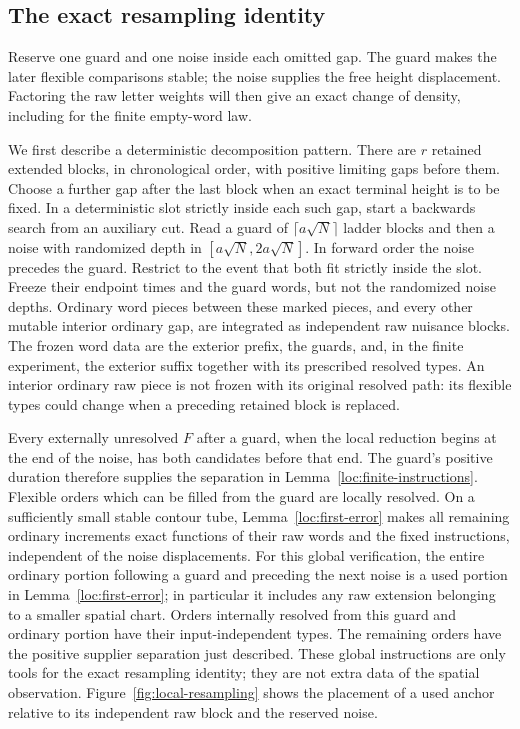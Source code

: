 \subsection{The exact resampling identity}

Reserve one guard and one noise inside each omitted gap. The guard makes
the later flexible comparisons stable; the noise supplies the free height
displacement. Factoring the raw letter weights will then give an exact
change of density, including for the finite empty-word law.

We first describe a deterministic decomposition pattern.  There are
$r$ retained extended blocks, in chronological order, with positive
limiting gaps before them.  Choose a further gap after the last block
when an exact terminal height is to be fixed.  In a deterministic slot
strictly inside each such gap, start a backwards search from an auxiliary
cut.  Read a guard of $\lceil a\sqrt N\rceil$ ladder blocks and then
a noise with randomized depth in $[a\sqrt N,2a\sqrt N]$.  In forward
order the noise precedes the guard.  Restrict to the event that both fit
strictly inside the slot.  Freeze their endpoint times and the guard
words, but not the randomized noise depths.  Ordinary word pieces between
these marked pieces, and every other mutable interior ordinary gap, are
integrated as independent raw nuisance blocks.  The frozen word data
are the exterior prefix, the guards, and, in the finite experiment, the
exterior suffix together with its prescribed resolved types.  An
interior ordinary raw piece is not frozen with its original resolved
path: its flexible types could change when a preceding retained block
is replaced.

Every externally unresolved $F$ after a guard, when the local reduction
begins at the end of the noise, has both candidates before that end.
The guard's positive duration therefore supplies the separation in
Lemma~\ref{loc:finite-instructions}.  Flexible orders which can be filled
from the guard are locally resolved.  On a sufficiently small stable
contour tube, Lemma~\ref{loc:first-error} makes all remaining ordinary
increments exact functions of their raw words and the fixed instructions,
independent of the noise displacements.
For this global verification, the entire ordinary portion following
a guard and preceding the next noise is a used portion in
Lemma~\ref{loc:first-error}; in particular it includes any raw
extension belonging to a smaller spatial chart.  Orders internally
resolved from this guard and ordinary portion have their input-independent
types.  The remaining orders have the positive supplier separation just
described.  These global instructions are only tools for the exact
resampling identity; they are not extra data of the spatial observation.
Figure~\ref{fig:local-resampling} shows the placement of a used anchor
relative to its independent raw block and the reserved noise.

